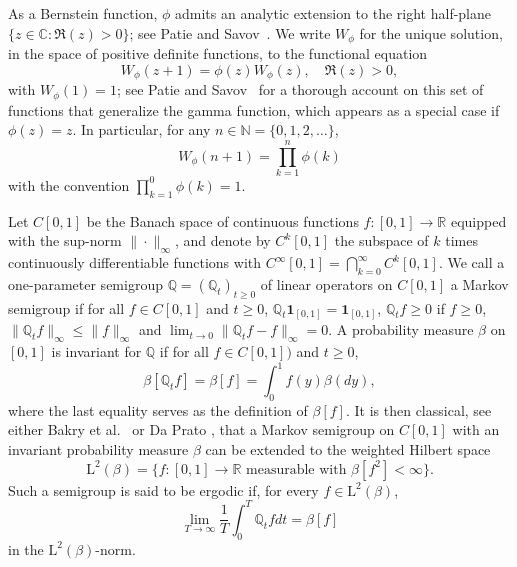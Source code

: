 \documentclass[JEP,XML,SOM,Unicode]{cedram}
\let\ra\rightarrow
\theoremstyle{plain}
\theoremstyle{definition}
\newcommand{\N}{\mathbb{N}}
\newcommand{\R}{\mathbb{R}}
\newcommand{\J}{\mathds{Q}}
\newcommand{\Leb}{\mathrm{L}}
\let\bpsi\beta
\begin{document}
As a Bernstein function, $\phi$ admits an analytic extension to the right half-plane $\{z \in \mathbb{C} : \Re(z)\!>\!0\}$; see \eg Patie and Savov~\cite[Chap.\,4]{Patie-Savov-GeL}. We write $W_{\phi}$ for the unique solution, in the space of positive definite functions, to the functional equation
\begin{equation*}
W_{\phi}(z+1)=\phi(z)W_{\phi}(z), \quad \Re(z)>0,
\end{equation*}
with $W_{\phi}(1)=1$; see Patie and Savov~\cite{Patie-Savov-Bern} for a thorough account on this set of functions that generalize the gamma function, which appears as a special case if $\phi(z)=z$. In particular, for any
$n\in \N = \{0,1,2, \dots\}$,
\begin{equation}
\label{eq:product-Wphi}
W_{\phi}(n+1)=\prod_{k=1}^n \phi(k)
\end{equation}
with the convention $\prod_{k=1}^0 \phi(k) = 1$.

Let $C[0,1]$ be the Banach space of continuous functions $f \colon [0,1] \to \R$ equipped with the
sup-norm $\| {\cdot} \|_\infty$, and denote by $C^k[0,1]$ the subspace of $k$ times continuously
differentiable functions with $C^\infty[0,1] = \bigcap_{k=0}^\infty C^k[0,1]$. We call a one-parameter semigroup
$\J = (\J_t)_{t \geq 0}$ of linear operators on $C[0,1]$ a Markov semigroup if for all $f \in C[0,1]$ and $t \ge 0$,
$\J_t \bm{1}_{[0,1]} = \bm{1}_{[0,1]}$, $\J_t f \geq 0$ if $f \geq 0$, $\|\J_t f\|_\infty \leq \|f\|_\infty$
and $\lim_{t\to 0} \|\J_t f - f\|_\infty = 0$. A probability measure $\bpsi$ on $[0,1]$ is invariant for $\J$ if for all $f \in C[0,1])$ and $t \ge 0$,
\begin{equation*}
\bpsi [ \J_t f ] = \bpsi[f] =\int_0^1 f(y)\bpsi(dy),
\end{equation*}
where the last equality serves as the definition of $\bpsi[f]$. It is then classical, see either Bakry et al.~\cite{Bakry_Book} or Da Prato \cite{da-prato:2006}, that a Markov semigroup on $C[0,1]$ with an invariant probability measure $\bpsi$
can be extended to the weighted Hilbert space
\begin{equation*}
\Leb^2(\bpsi) =\lbrace f \colon [0,1] \ra \R \textrm{ measurable with } \bpsi[f^2] <\infty\rbrace.
\end{equation*}
Such a semigroup is said to be ergodic if, for every $f \in \Leb^2(\bpsi)$,\vspace*{-3pt}
\[
\lim_{T \to \infty} \frac{1}{T} \int_0^T \J_t f dt = \bpsi[f]
\]
in the $\Leb^2(\bpsi)$-norm.
\end{document}
